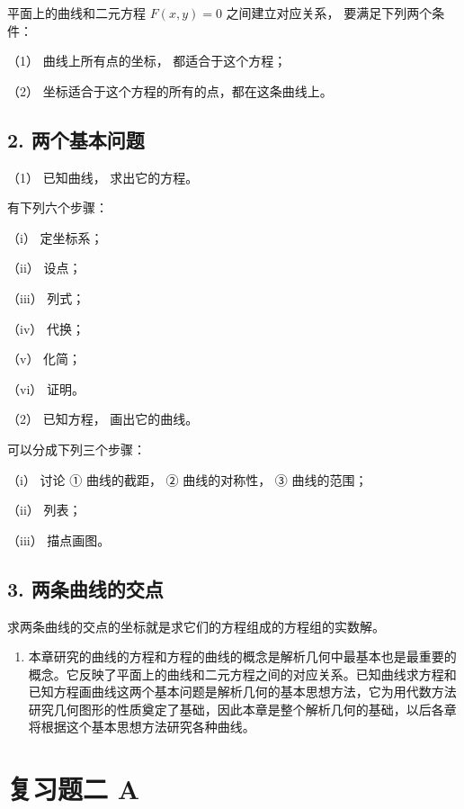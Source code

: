 平面上的曲线和二元方程 \(F(x, y) = 0\) 之间建立对应关系，
要满足下列两个条件：

（1） 曲线上所有点的坐标， 都适合于这个方程；

（2） 坐标适合于这个方程的所有的点，都在这条曲线上。

\subsection{2. 两个基本问题}\label{ux4e24ux4e2aux57faux672cux95eeux9898}

（1） 已知曲线， 求出它的方程。

有下列六个步骤：

（i） 定坐标系；

（ii） 设点；

（iii） 列式；

（iv） 代换；

（v） 化简；

（vi） 证明。

（2） 已知方程， 画出它的曲线。

可以分成下列三个步骤：

（i） 讨论 ① 曲线的截距， ② 曲线的对称性， ③ 曲线的范围；

（ii） 列表；

（iii） 描点画图。

\subsection{3.
两条曲线的交点}\label{ux4e24ux6761ux66f2ux7ebfux7684ux4ea4ux70b9}

求两条曲线的交点的坐标就是求它们的方程组成的方程组的实数解。

\begin{enumerate}
\def\labelenumi{\arabic{enumi}.}
\setcounter{enumi}{3}
\tightlist
\item
  本章研究的曲线的方程和方程的曲线的概念是解析几何中最基本也是最重要的概念。它反映了平面上的曲线和二元方程之间的对应关系。已知曲线求方程和已知方程画曲线这两个基本问题是解析几何的基本思想方法，它为用代数方法研究几何图形的性质奠定了基础，因此本章是整个解析几何的基础，以后各章将根据这个基本思想方法研究各种曲线。
\end{enumerate}

\section{复习题二 A}\label{ux590dux4e60ux9898ux4e8c-a}

